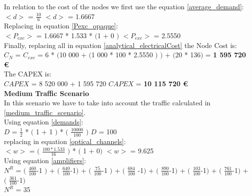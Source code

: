 In relation to the cost of the nodes we first use the equation \ref{average_demand}:\\

$<d>$ = $\frac{10}{6}$ \qquad \qquad $<d>$ = 1.6667\\

Replacing in equation \ref{Pexc_opaque}:\\

$<P_{exc}>$ = 1.6667 * 1.533 * $($1 + $0$ $)$ \qquad \qquad $<P_{exc}>$ = 2.5550 \\

Finally, replacing all in equation \ref{analytical_electricalCost} the Node Cost is:\\

$C_N$ = $C_{exc}$ = 6 * $($10 000 + $($1 000 * 100 * 2.5550 $)$ $)$ + $($20 * 136$)$ = \textbf{1 595 720 \euro}\\

The CAPEX is:\\

$CAPEX$ = 8 520 000 + 1 595 720 \qquad \qquad $CAPEX$ = \textbf{10 115 720 \euro}\\

\textbf{Medium Traffic Scenario}\\

In this scenario we have to take into account the traffic calculated in \ref{medium_traffic_scenario}.\\

Using equation \ref{demands}:\\

$D$ = $\frac{1}{2}$ * $($ 1 + 1 $)$ * $($ $\frac{10 000}{100}$ $)$ \qquad \qquad $D$ = 100\\

replacing in equation \ref{optical_channels}:\\

$<w>$ = $($ $\frac{100 * 1.533}{16}$ $)$ * $($ 1 + 0$)$ \qquad \quad $<w>$ = 9.625\\

Using equation \ref{amplifiers}:\\

$N^R$ = $($ $\frac{460}{100}$-1 $)$ + $($ $\frac{640}{100}$-1$)$ + $($ $\frac{75}{100}$-1 $)$ + $($ $\frac{684}{100}$ -1$)$ + $($ $\frac{890}{100}$-1$)$ + $($ $\frac{103}{100}$-1$)$ + $($ $\frac{761}{100}$-1$)$ + $($ $\frac{361}{100}$-1$)$\\

$N^R$ = 35\\

